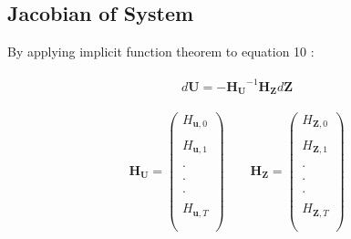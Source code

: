 \documentclass[titlepage]{\econtex}\providecommand{\texname}{BufferStockTheory}
\begin{document}
\hypertarget{Jacobian of System}{}
\subsection{Jacobian of System} 

By applying implicit function theorem to equation 10 : \\ \\

$$d\mathbf{U} =  -{\mathbf{H}_{\mathbf{U}}}^{-1} \mathbf{H}_{\mathbf{Z}} d \mathbf{Z}$$ \\ 


 $$  \mathbf{H}_{\mathbf{U}}= \begin{pmatrix} 
H_{\mathbf{u}, 0} \\ \\ 
H_{\mathbf{u}, 1}  \\ \\
. \\ \\
. \\ \\
. \\ \\ 
H_{\mathbf{u}, T} \\ \\
 \end{pmatrix} \quad \quad \mathbf{H}_{\mathbf{Z}}= \begin{pmatrix} 
H_{\mathbf{Z}, 0} \\ \\ 
H_{\mathbf{Z}, 1}  \\ \\
. \\ \\
. \\ \\
. \\ \\ 
H_{\mathbf{Z}, T} \\ \\
 \end{pmatrix}$$ \\ \\
 
 
 
\end{document}
